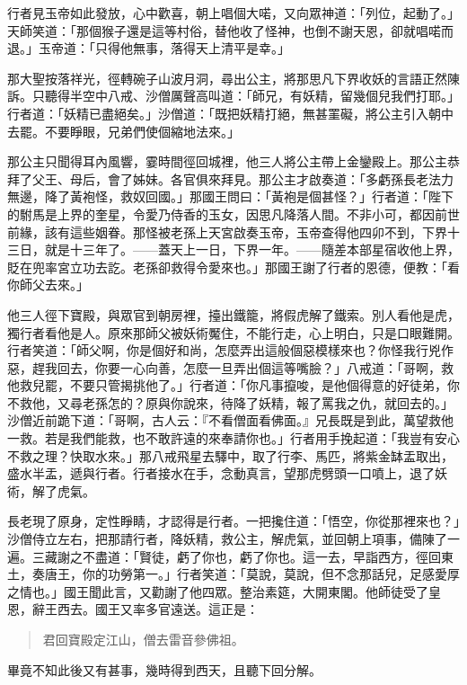 行者見玉帝如此發放，心中歡喜，朝上唱個大喏，又向眾神道：「列位，起動了。」天師笑道：「那個猴子還是這等村俗，替他收了怪神，也倒不謝天恩，卻就唱喏而退。」玉帝道：「只得他無事，落得天上清平是幸。」

那大聖按落祥光，徑轉碗子山波月洞，尋出公主，將那思凡下界收妖的言語正然陳訴。只聽得半空中八戒、沙僧厲聲高叫道：「師兄，有妖精，留幾個兒我們打耶。」行者道：「妖精已盡絕矣。」沙僧道：「既把妖精打絕，無甚罣礙，將公主引入朝中去罷。不要睜眼，兄弟們使個縮地法來。」

那公主只聞得耳內風響，霎時間徑回城裡，他三人將公主帶上金鑾殿上。那公主恭拜了父王、母后，會了姊妹。各官俱來拜見。那公主才啟奏道：「多虧孫長老法力無邊，降了黃袍怪，救奴回國。」那國王問曰：「黃袍是個甚怪？」行者道：「陛下的駙馬是上界的奎星，令愛乃侍香的玉女，因思凡降落人間。不非小可，都因前世前緣，該有這些姻眷。那怪被老孫上天宮啟奏玉帝，玉帝查得他四卯不到，下界十三日，就是十三年了。——蓋天上一日，下界一年。——隨差本部星宿收他上界，貶在兜率宮立功去訖。老孫卻救得令愛來也。」那國王謝了行者的恩德，便教：「看你師父去來。」

他三人徑下寶殿，與眾官到朝房裡，擡出鐵籠，將假虎解了鐵索。別人看他是虎，獨行者看他是人。原來那師父被妖術魘住，不能行走，心上明白，只是口眼難開。行者笑道：「師父啊，你是個好和尚，怎麼弄出這般個惡模樣來也？你怪我行兇作惡，趕我回去，你要一心向善，怎麼一旦弄出個這等嘴臉？」八戒道：「哥啊，救他救兒罷，不要只管揭挑他了。」行者道：「你凡事攛唆，是他個得意的好徒弟，你不救他，又尋老孫怎的？原與你說來，待降了妖精，報了罵我之仇，就回去的。」沙僧近前跪下道：「哥啊，古人云：『不看僧面看佛面。』兄長既是到此，萬望救他一救。若是我們能救，也不敢許遠的來奉請你也。」行者用手挽起道：「我豈有安心不救之理？快取水來。」那八戒飛星去驛中，取了行李、馬匹，將紫金缽盂取出，盛水半盂，遞與行者。行者接水在手，念動真言，望那虎劈頭一口噴上，退了妖術，解了虎氣。

長老現了原身，定性睜睛，才認得是行者。一把攙住道：「悟空，你從那裡來也？」沙僧侍立左右，把那請行者，降妖精，救公主，解虎氣，並回朝上項事，備陳了一遍。三藏謝之不盡道：「賢徒，虧了你也，虧了你也。這一去，早詣西方，徑回東土，奏唐王，你的功勞第一。」行者笑道：「莫說，莫說，但不念那話兒，足感愛厚之情也。」國王聞此言，又勸謝了他四眾。整治素筵，大開東閣。他師徒受了皇恩，辭王西去。國王又率多官遠送。這正是：
\begin{quote}
君回寶殿定江山，僧去雷音參佛祖。
\end{quote}

畢竟不知此後又有甚事，幾時得到西天，且聽下回分解。
